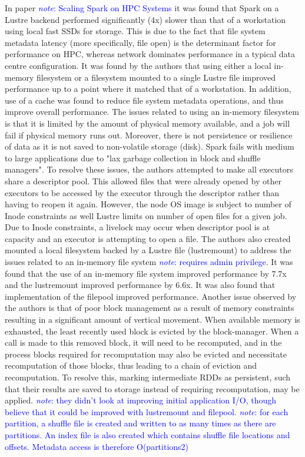 \documentclass{report}
\newcommand{\note}[1]{\textcolor{blue}{\textit{note}: #1}}
\begin{document}
    In paper \note{Scaling Spark on HPC Systems} it was found that Spark on a
    Lustre backend performed significantly (4x) slower than that of a
    workstation using local fast SSDs for storage. This is due to the fact that
    file system metadata latency (more specifically, file open) is the
    determinant factor for performance on HPC, whereas network dominates
    performance in a typical data centre configuration. It was found by the
    authors that using either a local in-memory filesystem or a filesystem
    mounted to a single Lustre file improved performance up to a point where it
    matched that of a workstation. In addition, use of a cache was found to
    reduce file system metadata operations, and thus improve overall
    performance.  The issues related to using an in-memory filesystem is that it
    is limited by the amount of physical memory available, and a job will fail
    if physical memory runs out. Moreover, there is not persistence or
    resilience of data as it is not saved to non-volatile storage (disk). Spark
    fails with medium to large applications due to "lax garbage collection in
    block and shuffle managers". To resolve these issues, the authors attempted
    to make all executors share a descriptor pool. This allowed files that were
    already opened by other executors to be accessed by the executor through the
    descriptor rather than having to reopen it again. However, the node OS image
    is subject to number of Inode constraints as well Lustre limits on number of
    open files for a given job. Due to Inode constraints, a livelock may occur
    when descriptor pool is at capacity and an executor is attempting to open a
    file. The authors also created mounted a local filesystem backed by a Lustre
    file (lustremount) to address the issues related to an in-memory file system
    \note{requires admin privilege}. It was found that the use of an in-memory
    file system improved performance by 7.7x and the lustremount improved
    performance by 6.6x. It was also found that implementation of the filepool
    improved performance.  Another issue observed by the authors is that of poor
    block management as a result of memory constraints resulting in a
    significant amount of vertical movement. When available memory is exhausted,
    the least recently used block is evicted by the block-manager. When a call
    is made to this removed block, it will need to be recomputed, and in the
    process blocks required for recomputation may also be evicted and
    necessitate recomputation of those blocks, thus leading to a chain of
    eviction and recomputation. To resolve this, marking intermediate RDDs as
    persistent, such that their results are saved to storage instead of
    requiring recomputation, may be applied.  \note{they didn't look at
    improving initial application I/O, though believe that it could be improved
    with lustremount and filepool. } \note{for each partition, a shuffle file is
    created and written to as many times as there are partitions. An index file
    is also created which contains shuffle file locations and offsets. Metadata
    access is therefore O(partitions2)}
	
\end{document}
